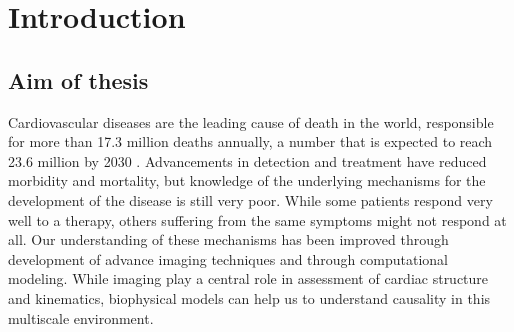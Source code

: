 \chapter{Introduction}







\section{Aim of thesis}
Cardiovascular diseases are the leading cause of death in the
world, responsible for more than 17.3 million deaths annually, a
number that is expected to reach 23.6 million by 2030
\cite{writing2016heart}. Advancements in detection and treatment
have reduced morbidity and mortality, but knowledge of the underlying
mechanisms for the development of the disease is still very poor.
While some patients respond very well to a therapy, others suffering
from the same symptoms might not respond at all.
Our understanding of these mechanisms has been improved through
development of advance imaging techniques and through
computational modeling. While imaging play a central role in
assessment of cardiac structure and kinematics, biophysical models can
help us to understand causality in this multiscale environment.  


